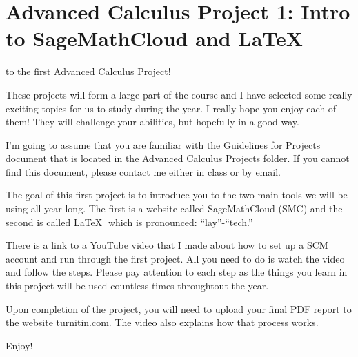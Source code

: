 \documentclass
[justified,nohyper]
{tufte-handout}
\begin{document}
\begin{center}
\end{center}
\section{Advanced Calculus Project 1: Intro to SageMathCloud and \LaTeX}
 to the first Advanced Calculus Project!

These projects will form a large part of the course and I have selected some really exciting topics for us to study during the year. I really hope you enjoy each of them! They will challenge your abilities, but hopefully in a good way.

I'm going to assume that you are familiar with the Guidelines for Projects document that is located in the Advanced Calculus Projects folder. If you cannot find this document, please contact me either in class or by email.

The goal of this first project is to introduce you to the two main tools we will be using all year long. The first is a website called SageMathCloud (SMC) and the second is called \LaTeX$\;$ which is pronounced: ``lay''-``tech.''

There is a link to a YouTube video that I made about how to set up a SCM account and run through the first project. All you need to do is watch the video and follow the steps. Please pay attention to each step as the things you learn in this project will be used countless times throughtout the year.

Upon completion of the project, you will need to upload your final PDF report to the website turnitin.com. The video also explains how that process works.

Enjoy! 
\end{document}
